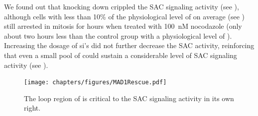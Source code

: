 We found out that knocking down  crippled the SAC signaling activity (see ), although cells with less than 10\% of the physiological level of  on average (see ) still arrested in mitosis for hours when treated with \SI{100}{nM} nocodazole (only about two hours less than the control group with a physiological level of ). Increasing the dosage of si's did not further decrease the SAC activity, reinforcing that even a small pool of  could sustain a considerable level of SAC signaling activity (see ).

\begin{figure}
    \centering
    \texttt{[image: chapters/figures/MAD1Rescue.pdf]}
    \caption{The loop region of  is critical to the SAC signaling activity in its own right.}
    \label{MAD1Rescue}
\end{figure}
